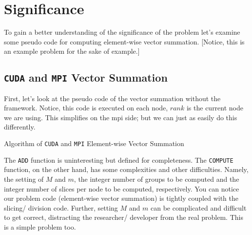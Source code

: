 \section{Significance}

To gain a better understanding of the significance of the problem let's examine
some pseudo code for computing element-wise vector summation. [Notice, this is
an example problem for the sake of example.]

\subsection{\texttt{CUDA} and \texttt{MPI} Vector Summation}

First, let's look at the pseudo code of the vector summation without the
framework. Notice, this code is executed on each node, $rank$ is the current
node we are using. This simplifies  on the \gls{mpi} side; but we can just as
easily do this differently.

\begin{algorithm}
\begin{algorithmic}
\EndFunction{}
    \EndFor{}
\EndFunction{}
\end{algorithmic}
\label{alg:cuda_mpi_vsum}
\caption{Algorithm of \texttt{CUDA} and \texttt{MPI} Element-wise Vector
Summation}
\end{algorithm}

The \texttt{ADD} function is uninteresting but defined for completeness. The
\texttt{COMPUTE} function, on the other hand, has some complexities and other
difficulties. Namely, the setting of $M$ and $m$, the integer number of groups
to be computed and the integer number of slices per node to be computed,
respectively. You can notice our problem code (element-wise vector summation)
is tightly coupled with the slicing/ division code. Further, setting $M$ and
$m$ can be complicated and difficult to get correct, distracting the
researcher/ developer from the real problem. This is a simple problem too.

